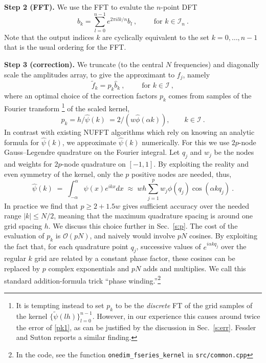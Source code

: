 \documentclass[10pt]{article}
\newcommand{\be}{\begin{equation}}
\newcommand{\ee}{\end{equation}}
\newcommand{\bigO}{{\mathcal O}}
\newcommand{\KK}{{\mathcal I}}     %
\newcommand{\ppsi}{{\tilde\psi}}   %
\newcommand{\al}{\alpha}           %
\begin{document}
{\bf Step 2 (FFT).}
We use the FFT to evalute the $n$-point DFT
\be
\hat{b}_k = \sum_{l=0}^{n-1} e^{2\pi i lk/n} b_l ~, \qquad \mbox{ for } k\in\KK_n
~.
\label{dft1}
\ee
Note that the output indices $k$ are cyclically equivalent to the
set $k=0,\dots,n-1$ that is the usual ordering for the FFT.

{\bf Step 3 (correction).}
We truncate (to the central $N$ frequencies) and
diagonally scale the amplitudes array, to give
the approximant to $f_j$, namely
\be
\tilde f_k = p_k \hat{b}_k ~, \qquad \mbox{ for } k\in\KK
~,
\label{pb1}
\ee
where an optimal choice of the correction factors $p_k$ comes from
samples of the Fourier transform%
\footnote{It is tempting instead to set $p_k$ to be the {\em discrete} FT
  of the grid samples of the kernel $\{\ppsi(lh)\}_{l=0}^{n-1}$.
  However, in our
  experience this causes around twice the error of \eqref{pk1},
  as can be justified by the discussion in Sec.~\ref{s:err}.
Fessler and Sutton \cite[Sec.~V.C.3]{fessler} reports a similar finding.}
of the scaled kernel,
\be p_k = h / \hat\psi(k)~ = 2/(w\hat\phi(\alpha k)), \qquad k\in\KK
\label{pk1}
~.
\ee
In contrast with existing NUFFT algorithms
which rely on knowing an analytic formula for $\hat\psi(k)$,
we approximate $\hat\psi(k)$
numerically. For this we use $2p$-node Gauss--Legendre quadrature
on the Fourier integral. Let $q_j$ and $w_j$ be the nodes and weights
for $2p$-node quadrature on $[-1,1]$.
By exploiting the reality and even symmetry of the kernel,
only the $p$ positive nodes are needed, thus,
$$
\hat\psi(k) \;=\; 
\int_{-\al}^{\al} \psi(x) e^{ikx} dx
\;\approx\;
wh \sum_{j=1}^p w_j \phi(q_j) \cos (\al k q_j)
~.
$$
In practice we find that $p\ge 2+1.5 w$ gives sufficient accuracy
over the needed range $|k|\le N/2$,
meaning that the maximum quadrature spacing is around one
grid spacing $h$.
We discuss this choice further in Sec.~\ref{s:p}.
The cost of the evaluation of $p_k$ is $\bigO(pN)$,
and naively would involve $pN$ cosines.
By exploiting the fact that, for each quadrature point $q_j$,
successive values of $e^{i \al k q_j}$ over the regular $k$ grid are
related by a constant phase factor, these cosines
can be replaced by $p$ complex exponentials and $pN$ adds and multiplies.
We call this standard addition-formula trick
``phase winding.''\footnote{In the code, see the function
  {\tt onedim\_fseries\_kernel} in {\tt src/common.cpp}}
  
\end{document}
